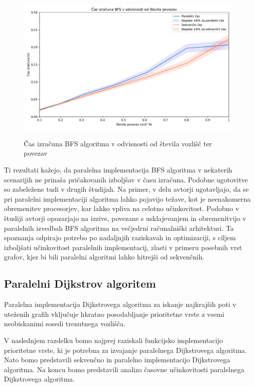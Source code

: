 \documentclass[mat1, tisk]{fmfdelo}
\begin{document}
\begin{figure}[h!]
  \centering
  \caption{Čas izračuna BFS algoritma v odvisnosti od števila vozlišč ter povezav}
  \includegraphics[width=15cm]{slike/bfs_v_odvisnosti_od_velikosti_grafa.pdf}
  \label{fig:bfs_calculation_time_by_graph_size}
\end{figure}

Ti rezultati kažejo, da paralelna implementacija BFS algoritma v nekaterih scenarijih ne prinaša pričakovanih izboljšav v času izračuna.
Podobne ugotovitve so zabeležene tudi v drugih študijah. Na primer, v delu \cite{kuroiwa2020analyzing} avtorji ugotavljajo,
da se pri paralelni implementaciji algoritma lahko pojavijo težave, kot je neenakomerna obremenitev procesorjev, kar
lahko vpliva na celotno učinkovitost. Podobno v študiji \cite{rudolf2019breadth} avtorji opozarjajo na izzive, povezane
s usklajevanjem in obremenitvijo v paralelnih izvedbah BFS algoritma na večjedrni računalniški arhitekturi.
Ta spoznanja odpirajo potrebo po nadaljnjih raziskavah in optimizaciji, s ciljem izboljšati učinkovitost paralelnih implementacij,
zlasti v primeru posebnih vrst grafov, kjer bi bili paralelni algoritmi lahko hitrejši od sekvenčnih.

\subsection{Paralelni Dijkstrov algoritem} \label{section:dijkstra}

Paralelna implementacija Dijkstrovega algoritma za iskanje najkrajših poti v uteženih grafih vključuje hkratno posodabljanje
prioritetne vrste z vsemi neobiskanimi sosedi trenutnega vozlišča.

V naslednjem razdelku bomo najprej raziskali funkcijsko implementacijo prioritetne vrste, ki je potrebna za izvajanje
paralelnega Dijkstrovega algoritma. Nato bomo predstavili sekvenčno in paralelno implementacijo Dijkstrovega algoritma. 
Na koncu bomo predstavili analizo časovne učinkovitosti paralelnega Dijkstrovega algoritma.
\end{document}
